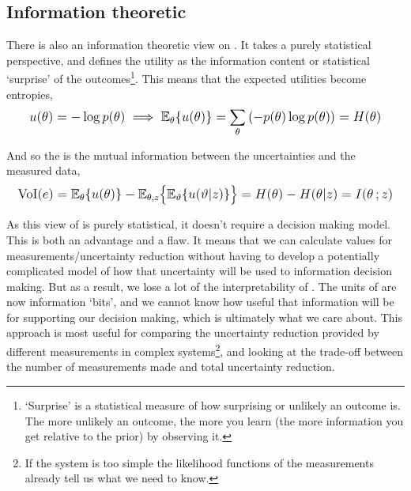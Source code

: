\subsection{Information theoretic }

There is also an information theoretic view on . It takes a purely statistical perspective, and defines the utility as the information content or statistical `surprise' of the outcomes\footnote{`Surprise' is a statistical measure of how surprising or unlikely an outcome is. The more unlikely an outcome, the more you learn (the more information you get relative to the prior) by observing it.}. This means that the expected utilities become entropies,
\begin{equation}
    \mathlarger{u(\theta) = -\log p(\theta) \implies \mathbb{E}_{\theta} \lbrace u(\theta) \rbrace = \sum_{\theta} \left( - p(\theta) \log p(\theta) \right) = H(\theta)}
\end{equation}

\noindent
And so the  is the mutual information between the uncertainties and the measured data,
\begin{equation}
    \mathlarger{\text{VoI}(e) = \mathbb{E}_{\theta} \lbrace u(\theta) \rbrace - \mathbb{E}_{\theta,z} \big\lbrace \mathbb{E}_{\vartheta} \lbrace u(\vartheta|z) \rbrace \big\rbrace = H(\theta) - H(\theta|z) = I(\theta\,;z)}
\end{equation}
\smallskip

\noindent
As this view of  is purely statistical, it doesn't require a decision making model. This is both an advantage and a flaw. It means that we can calculate  values for measurements/uncertainty reduction without having to develop a potentially complicated model of how that uncertainty will be used to information decision making. But as a result, we lose a lot of the interpretability of . The units of  are now information `bits', and we cannot know how useful that information will be for supporting our decision making, which is ultimately what we care about. This approach is most useful for comparing the uncertainty reduction provided by different measurements in complex systems\footnote{If the system is too simple the likelihood functions of the measurements already tell us what we need to know.}, and looking at the trade-off between the number of measurements made and total uncertainty reduction.\\


